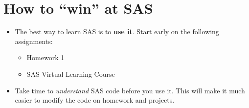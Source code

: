 \documentclass[12pt]{../notes}
\begin{document}
\section{How to ``win'' at SAS}
\begin{itemize}
\item The best way to learn SAS is to \textbf{use it}. Start early on the following assignments:
\begin{itemize}
\item Homework 1
\item SAS Virtual Learning Course
\end{itemize}
\item Take time to \textit{understand} SAS code before you use it. This will make it much easier to modify the code on homework and projects. 
\end{itemize}




\end{document}
